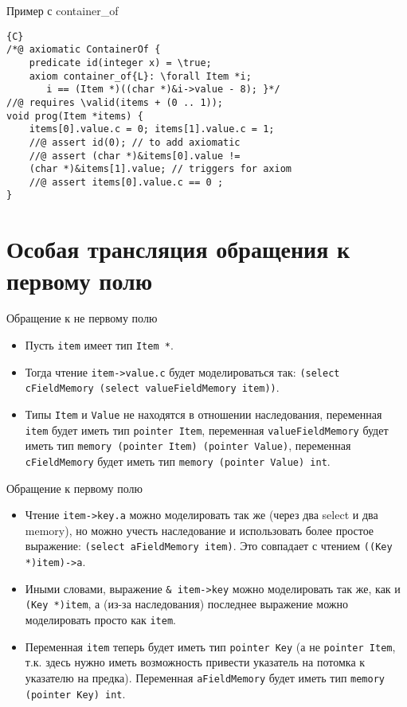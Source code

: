 \documentclass[hyperref={unicode=true}]{beamer}
\begin{document}
    \begin{frame}[fragile]{Пример с container\_of}
    \begin{lstlisting}{C}
/*@ axiomatic ContainerOf {
    predicate id(integer x) = \true;
    axiom container_of{L}: \forall Item *i;
       i == (Item *)((char *)&i->value - 8); }*/
//@ requires \valid(items + (0 .. 1));
void prog(Item *items) {
    items[0].value.c = 0; items[1].value.c = 1;
    //@ assert id(0); // to add axiomatic
    //@ assert (char *)&items[0].value !=
    (char *)&items[1].value; // triggers for axiom
    //@ assert items[0].value.c == 0 ;
}   \end{lstlisting}
    \end{frame}

    \section{Особая трансляция обращения к первому полю}

    \begin{frame}{Обращение к не первому полю}
    \begin{itemize}
    \item
    Пусть \texttt{item} имеет тип \texttt{Item *}.
    \item
    Тогда чтение \texttt{item->value.c} будет моделироваться
    так: \texttt{(select cFieldMemory (select valueFieldMemory item))}.
    \item
    Типы \texttt{Item} и \texttt{Value} не находятся
    в отношении наследования, переменная \texttt{item}
    будет иметь тип \texttt{pointer Item}, переменная
    \texttt{valueFieldMemory} будет иметь тип
    \texttt{memory (pointer Item) (pointer Value)},
    переменная \texttt{cFieldMemory} будет иметь тип
    \texttt{memory (pointer Value) int}.
    \end{itemize}
    \end{frame}

    \begin{frame}{Обращение к первому полю}
    \begin{itemize}
    \item
    Чтение \texttt{item->key.a} можно моделировать так же
    (через два select и два memory), но можно учесть
    наследование и использовать более простое выражение:
    \texttt{(select aFieldMemory item)}. Это совпадает
    с чтением \texttt{((Key *)item)->a}.
    \item
    Иными словами,
    выражение \texttt{\& item->key} можно моделировать так же,
    как и \texttt{(Key *)item}, а (из-за наследования)
    последнее выражение можно моделировать просто как \texttt{item}.
    \item
    Переменная \texttt{item} теперь будет иметь тип
    \texttt{pointer Key} (а не \texttt{pointer Item},
    т.к. здесь нужно иметь возможность привести
    указатель на потомка к указателю на предка). Переменная
    \texttt{aFieldMemory} будет иметь тип
    \texttt{memory (pointer Key) int}.
    \end{itemize}
    \end{frame}
\end{document}
